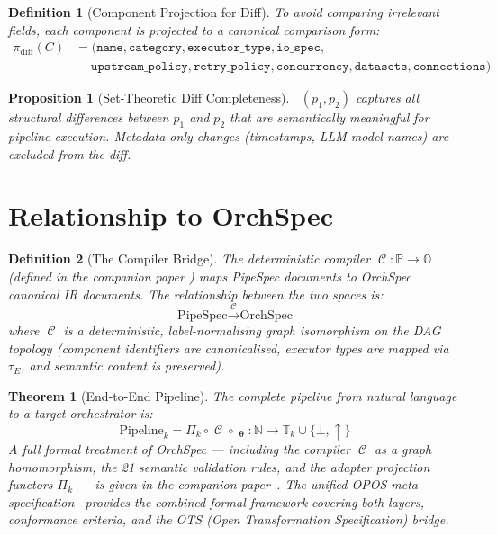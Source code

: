 \documentclass[11pt,a4paper]{article}
\newtheorem{definition}{Definition}[section]
\newtheorem{theorem}{Theorem}[section]
\newtheorem{proposition}{Proposition}[section]
\theoremstyle{definition}
\DeclareMathOperator{\ExtractLLM}{\mathcal{E}_{\bm\theta}}
\DeclareMathOperator{\DiffP}{\Delta_P}
\DeclareMathOperator{\Compile}{\mathcal{C}}
\newcommand{\nspace}{\mathbb{N}}
\newcommand{\pspace}{\mathbb{P}}
\newcommand{\ospace}{\mathbb{O}}
\newcommand{\tspacek}{\mathbb{T}_k}
\begin{document}
\begin{definition}[Component Projection for Diff]
To avoid comparing irrelevant fields, each component is projected to a canonical comparison form:
\begin{align}
\pi_{\text{diff}}(C) &= (\texttt{name}, \texttt{category}, \texttt{executor\_type}, \texttt{io\_spec}, \\
&\quad\; \texttt{upstream\_policy}, \texttt{retry\_policy}, \texttt{concurrency}, \texttt{datasets}, \texttt{connections})
\end{align}
\end{definition}

\begin{proposition}[Set-Theoretic Diff Completeness]
$\DiffP(p_1, p_2)$ captures all structural differences between $p_1$ and $p_2$ that are semantically meaningful for pipeline execution. Metadata-only changes (timestamps, LLM model names) are excluded from the diff.
\end{proposition}

\section{Relationship to OrchSpec}

\begin{definition}[The Compiler Bridge]
The deterministic compiler $\Compile : \pspace \to \ospace$ (defined in the companion paper \cite{orchspec-formal}) maps PipeSpec documents to OrchSpec canonical IR documents. The relationship between the two spaces is:
\begin{equation}
\text{PipeSpec} \xrightarrow{\Compile} \text{OrchSpec}
\end{equation}
where $\Compile$ is a deterministic, label-normalising graph isomorphism on the DAG topology (component identifiers are canonicalised, executor types are mapped via $\tau_E$, and semantic content is preserved).
\end{definition}

\begin{theorem}[End-to-End Pipeline]
The complete pipeline from natural language to a target orchestrator is:
\begin{equation}
\text{Pipeline}_k = \Pi_k \circ \Compile \circ \ExtractLLM_{\bm\theta} : \nspace \to \tspacek \cup \{\bot, \uparrow\}
\end{equation}
A full formal treatment of OrchSpec — including the compiler $\Compile$ as a graph homomorphism, the 21 semantic validation rules, and the adapter projection functors $\Pi_k$ — is given in the companion paper~\cite{orchspec-formal}. The unified OPOS meta-specification~\cite{opos-formal} provides the combined formal framework covering both layers, conformance criteria, and the OTS (Open Transformation Specification) bridge.
\end{theorem}
\end{document}
